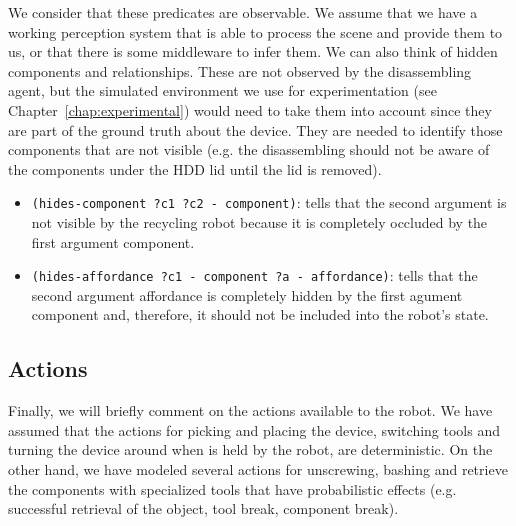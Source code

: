 \documentclass[../root.tex]{subfiles}
\begin{document}
We consider that these predicates are observable. We assume that we
have a working
perception system that is able to process the scene and
provide them to us, or that there is some middleware to infer them.
We can also think of hidden components and
relationships. These are not observed by the disassembling agent, but the
simulated environment we use for experimentation (see
Chapter~\ref{chap:experimental}) would need to take them into
account since they are part of the ground truth about the device.
They are needed to
identify those components that are not visible (e.g. the disassembling
should not be aware of the components under the HDD lid until the
lid is removed).
\begin{itemize}
	\item \texttt{(hides-component ?c1 ?c2 - component)}: tells that
	the second argument is not visible by the recycling robot because
	it is completely occluded by the first argument component.
	\item \texttt{(hides-affordance ?c1 - component ?a - affordance)}:
	tells that the second argument affordance is completely hidden
	by the first agument component and, therefore, it should not be
	included into the robot's state.
\end{itemize}

\subsection{Actions}

Finally, we will briefly comment on the actions available to the robot.
We have assumed that the actions for picking and placing the device,
switching tools and turning the device around when is held by the robot,
are deterministic. On the other hand, we have modeled several actions
for unscrewing, bashing and retrieve the components with
specialized tools that have probabilistic effects (e.g. successful
retrieval of the object, tool break, component break).
\end{document}
